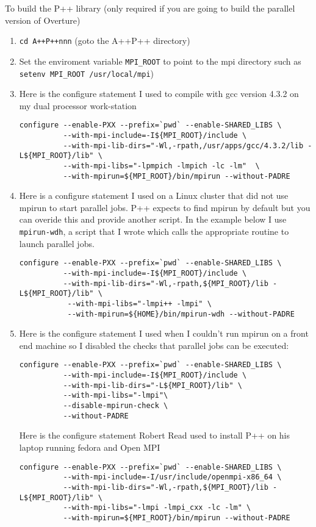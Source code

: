 \documentclass{article}
\begin{document}
To build the P++ library (only required if you are going to build the parallel version of Overture)
\begin{enumerate}
    \item {\tt cd A++P++nnn} (\qquad goto the A++P++ directory)
    \item  Set the enviroment variable {\tt MPI\_ROOT} to point to the mpi directory such as
            {\tt setenv MPI\_ROOT /usr/local/mpi})
    \item Here is the configure statement I used to compile with gcc version 4.3.2 on my dual processor work-station
\begin{verbatim}
configure --enable-PXX --prefix=`pwd` --enable-SHARED_LIBS \
          --with-mpi-include=-I${MPI_ROOT}/include \
          --with-mpi-lib-dirs="-Wl,-rpath,/usr/apps/gcc/4.3.2/lib -L${MPI_ROOT}/lib" \
          --with-mpi-libs="-lpmpich -lmpich -lc -lm"  \
          --with-mpirun=${MPI_ROOT}/bin/mpirun --without-PADRE
\end{verbatim}
    \item Here is a configure statement I used on a Linux cluster that did not use mpirun to start parallel
      jobs. P++ expects to find mpirun by default but you can overide this and provide another script. In the example below 
      I use {\tt mpirun-wdh}, a script that I wrote which calls the appropriate routine to launch parallel jobs. 
\begin{verbatim}
configure --enable-PXX --prefix=`pwd` --enable-SHARED_LIBS \
          --with-mpi-include=-I${MPI_ROOT}/include \
          --with-mpi-lib-dirs="-Wl,-rpath,${MPI_ROOT}/lib -L${MPI_ROOT}/lib" \
           --with-mpi-libs="-lmpi++ -lmpi" \
           --with-mpirun=${HOME}/bin/mpirun-wdh --without-PADRE
\end{verbatim}
    \item Here is the configure statement I used when I couldn't run mpirun on a front end machine so I disabled
the checks that parallel jobs can be executed: 
\begin{verbatim}
configure --enable-PXX --prefix=`pwd` --enable-SHARED_LIBS \
          --with-mpi-include=-I${MPI_ROOT}/include \
          --with-mpi-lib-dirs="-L${MPI_ROOT}/lib" \
          --with-mpi-libs="-lmpi"\
          --disable-mpirun-check \
          --without-PADRE
\end{verbatim}
Here is the configure statement Robert Read used to install P++ on his laptop running fedora and Open MPI
\begin{verbatim}
configure --enable-PXX --prefix=`pwd` --enable-SHARED_LIBS \
          --with-mpi-include=-I/usr/include/openmpi-x86_64 \
          --with-mpi-lib-dirs="-Wl,-rpath,${MPI_ROOT}/lib -L${MPI_ROOT}/lib" \
          --with-mpi-libs="-lmpi -lmpi_cxx -lc -lm" \
          --with-mpirun=${MPI_ROOT}/bin/mpirun --without-PADRE
\end{verbatim}


\end{enumerate}
\end{document}

